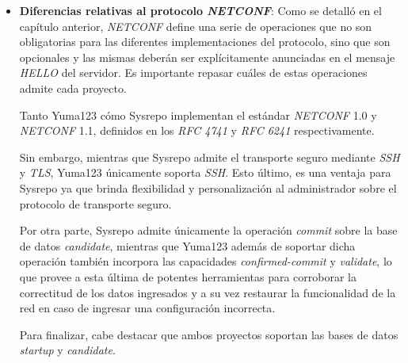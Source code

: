 \begin{itemize}
	\item \textbf{Diferencias relativas al protocolo \textit{NETCONF}}: Como se detalló en el capítulo anterior, \textit{NETCONF} define una serie de operaciones que no son obligatorias para las diferentes implementaciones del protocolo, sino que son opcionales y las mismas deberán ser explícitamente anunciadas en el mensaje \textit{HELLO} del servidor. Es importante repasar cuáles de estas operaciones admite cada proyecto. 
		
	Tanto Yuma123 \parencite{yuma123features} cómo Sysrepo \parencite{sysrepogit} implementan el estándar \textit{NETCONF} 1.0 y \textit{NETCONF} 1.1, definidos en los \textit{RFC 4741} \parencite{netconfrfc} y \textit{RFC 6241} \parencite{netconfrfcnuevo} respectivamente. 
	
	Sin embargo, mientras que Sysrepo admite el transporte seguro mediante \textit{SSH} y \textit{TLS}, Yuma123 únicamente soporta \textit{SSH}. Esto último, es una ventaja para Sysrepo ya que brinda flexibilidad y personalización al administrador sobre el protocolo de transporte seguro.
	
	Por otra parte, Sysrepo admite únicamente la operación \textit{commit} sobre la base de datos \textit{candidate}, mientras que Yuma123 además de soportar dicha operación también incorpora las capacidades \textit{confirmed-commit} y \textit{validate}, lo que provee a esta última de potentes herramientas para corroborar la correctitud de los datos ingresados y a su vez restaurar la funcionalidad de la red en caso de ingresar una configuración incorrecta.
	
	Para finalizar, cabe destacar que ambos proyectos soportan las bases de datos \textit{startup} y \textit{candidate}.


\end{itemize}
